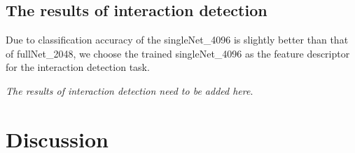 \subsection{The results of interaction detection}
Due to classification accuracy of the singleNet\_4096 is slightly better than that of fullNet\_2048, we choose the trained singleNet\_4096 as the feature descriptor for the interaction detection task.

\textcolor[rgb]{0,0,1}{\textit{\large The results of interaction detection need to be added here}}.
\\
\par

\section{Discussion}
